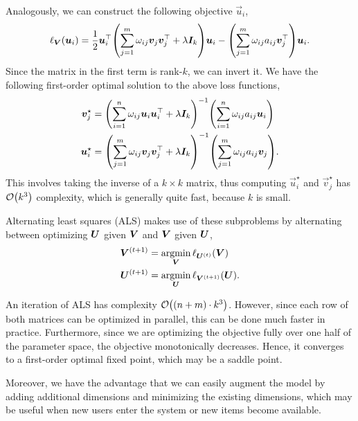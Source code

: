 Analogously, we can construct the following objective \wrt $\vec{u}_i$, \[
    \ell_{\mat{V}}(\vec{u}_i) = \frac{1}{2} \transpose{\vec{u}_i} \lft( \sum_{j=1}^{m} \omega_{ij} \vec{v}_j \transpose{\vec{v}_j} + \lambda \mat{I}_k \rgt) \vec{u}_i - \lft( \sum_{j=1}^{m} \omega_{ij} a_{ij} \transpose{\vec{v}_j} \rgt) \vec{u}_i.
\]
Since the matrix in the first term is rank-$k$, we can invert it. We have the following first-order
optimal solution to the above loss functions,
\begin{align*}
    \vec{v}_j^\star & = \inv{\lft( \sum_{i=1}^{n} \omega_{ij} \vec{u}_i \transpose{\vec{u}_i} + \lambda \mat{I}_k \rgt)} \lft( \sum_{i=1}^{n} \omega_{ij} a_{ij} \vec{u}_i \rgt)  \\
    \vec{u}_i^\star & = \inv{\lft( \sum_{j=1}^{m} \omega_{ij} \vec{v}_j \transpose{\vec{v}_j} + \lambda \mat{I}_k \rgt)} \lft( \sum_{j=1}^{m} \omega_{ij} a_{ij} \vec{v}_j \rgt).
\end{align*}
This involves taking the inverse of a $k\times k$ matrix, thus computing $\vec{u}_i^\star$ and
$\vec{v}_j^\star$ has $\bigo{k^3}$ complexity, which is generally quite fast, because $k$ is small.

Alternating least squares (ALS) makes use of these subproblems by alternating between optimizing
$\bm{U}$ given $\bm{V}$ and $\bm{V}$ given $\bm{U}$,
\begin{align*}
    \bm{V}^{(t+1)} & = \operatorname*{argmin}_{\bm{V}} \ell_{\bm{U}^{(t)}}(\bm{V})    \\
    \bm{U}^{(t+1)} & = \operatorname*{argmin}_{\bm{U}} \ell_{\bm{V}^{(t+1)}}(\bm{U}).
\end{align*}

\begin{important}
    An iteration of ALS has complexity $\bigo{(n+m)\cdot k^3}$. However, since each row of both matrices can be
    optimized in parallel, this can be done much faster in practice. Furthermore, since we are optimizing
    the objective fully over one half of the parameter space, the objective monotonically decreases.
    Hence, it converges to a first-order optimal fixed point, which may be a saddle point.

    Moreover, we have the advantage that we can easily augment the model by adding additional
    dimensions and minimizing \wrt the existing dimensions, which may be useful when new users enter
    the system or new items become available.
\end{important}


